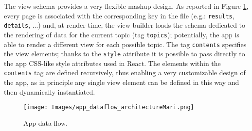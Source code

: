 The view schema provides a very flexible mashup design. As reported in Figure \ref{fig:requestFlowApp}, every page is
associated with the corresponding key in the file (e.g.: \texttt{results},
\texttt{details}, ...) and, at render time, the view builder loads the schema
dedicated to the rendering of data for the current topic (tag \texttt{topics}); potentially,
the app is able to render a different view for each possible topic.
The tag \texttt{contents} specifies the view elements; thanks to the
\texttt{style} attribute it is possible to pass directly to the app 
CSS-like style attributes used in React. The elements within the \texttt{contents} tag are
defined recursively, thus enabling a very customizable design of the
app, as in principle any single view element can be defined in this way and then dynamically instantiated.

\begin{figure} [t]
\centering
\texttt{[image: Images/app\_dataflow\_architectureMari.png]}
\caption{App data flow.}
\label{fig:requestFlowApp}
\end{figure}

